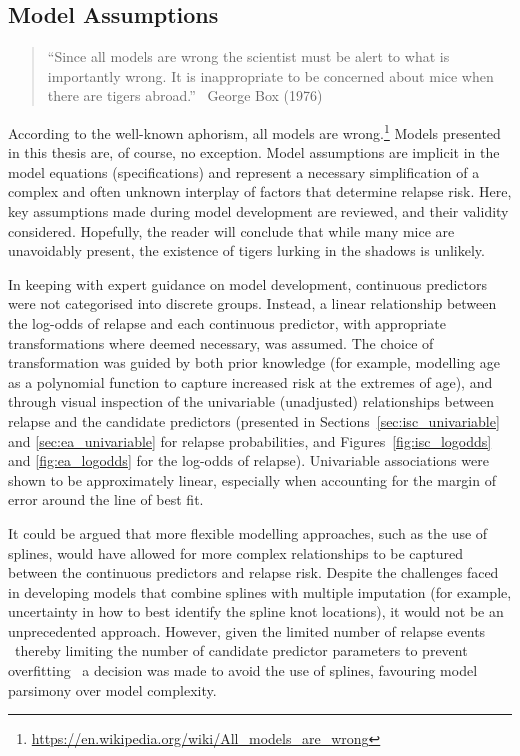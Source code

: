 \subsection{Model Assumptions}

\begin{quote}
  ``Since all models are wrong the scientist must be alert to what is importantly wrong. It is inappropriate to be concerned about mice when there are tigers abroad.'' \textemdash\ George Box (1976)\cite{box1976}
\end{quote}

According to the well-known aphorism, all models are wrong.\footnote{\url{https://en.wikipedia.org/wiki/All_models_are_wrong}} Models presented in this thesis are, of course, no exception. Model assumptions are implicit in the model equations (specifications) and represent a necessary simplification of a complex and often unknown interplay of factors that determine relapse risk. Here, key assumptions made during model development are reviewed, and their validity considered. Hopefully, the reader will conclude that while many mice are unavoidably present, the existence of tigers lurking in the shadows is unlikely.

In keeping with expert guidance on model development, continuous predictors were not categorised into discrete groups\cite{collins2024A}. Instead, a linear relationship between the log-odds of relapse and each continuous predictor, with appropriate transformations where deemed necessary, was assumed. The choice of transformation was guided by both prior knowledge (for example, modelling age as a polynomial function to capture increased risk at the extremes of age), and through visual inspection of the univariable (unadjusted) relationships between relapse and the candidate predictors (presented in Sections~\ref{sec:isc_univariable} and \ref{sec:ea_univariable} for relapse probabilities, and Figures~\ref{fig:isc_logodds} and \ref{fig:ea_logodds} for the log-odds of relapse). Univariable associations were shown to be approximately linear, especially when accounting for the margin of error around the line of best fit.

It could be argued that more flexible modelling approaches, such as the use of splines, would have allowed for more complex relationships to be captured between the continuous predictors and relapse risk. Despite the challenges faced in developing models that combine splines with multiple imputation (for example, uncertainty in how to best identify the spline knot locations), it would not be an unprecedented approach\cite{gupta2021,debray2023}. However, given the limited number of relapse events \textemdash\ thereby limiting the number of candidate predictor parameters to prevent overfitting \textemdash\ a decision was made to avoid the use of splines, favouring model parsimony over model complexity.

